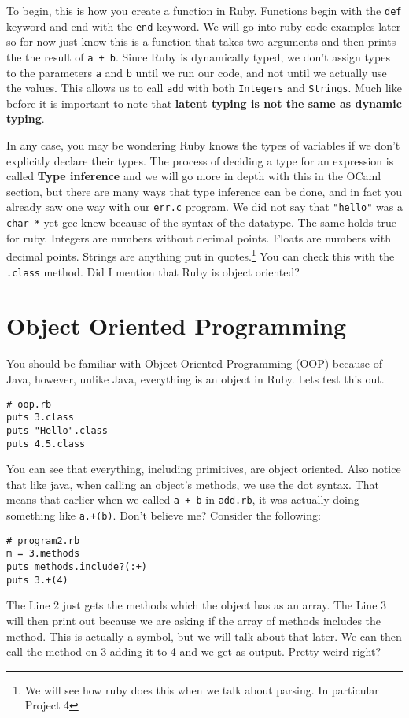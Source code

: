 \documentclass[main.tex]{subfiles}
\begin{document}
To begin, this is how you create a function in Ruby.
Functions begin with the \texttt{def} keyword and end with the \texttt{end} keyword. 
We will go into ruby code examples later so for now just know this is a function that takes two arguments and then prints the the result of \texttt{a + b}.
Since Ruby is dynamically typed, we don't assign types to the parameters \texttt{a} and \texttt{b} until we run our code, and not until we actually use the values.
This allows us to call \texttt{add} with both \texttt{Integers} and \texttt{Strings}. Much like before it is important to note that \textbf{latent typing is not the same as dynamic typing}.

In any case, you may be wondering Ruby knows the types of variables if we don't explicitly declare their types. 
The process of deciding a type for an expression is called \textbf{Type inference} and we will go more in depth with this in the OCaml section,
but there are many ways that type inference can be done, and in fact you already saw one way with our \texttt{err.c} program.
We did not say that \texttt{"hello"} was a \texttt{char *} yet gcc knew because of the syntax of the datatype. 
The same holds true for ruby. 
Integers are numbers without decimal points.
Floats are numbers with decimal points.
Strings are anything put in quotes.\footnote{We will see how ruby does this when we talk about parsing. In particular Project 4}
You can check this with the \texttt{.class} method. Did I mention that Ruby is object oriented?

\section{Object Oriented Programming}

You should be familiar with Object Oriented Programming (OOP) because of Java, however, unlike Java, everything is an object in Ruby. 
Lets test this out. 
\begin{lstlisting}[style=MyRubyStyle]
# oop.rb
puts 3.class
puts "Hello".class
puts 4.5.class
\end{lstlisting}
You can see that everything, including primitives, are object oriented. 
Also notice that like java, when calling an object's methods, we use the dot syntax.
That means that earlier when we called \texttt{a + b} in \texttt{add.rb}, it was actually doing something like \texttt{a.+(b)}. Don't believe me? 
Consider the following:
\begin{lstlisting}[style=MyRubyStyle]
# program2.rb
m = 3.methods
puts methods.include?(:+)
puts 3.+(4)
\end{lstlisting}
The Line 2 just gets the methods which the object  has as an array. The Line 3 will then print out  because we are asking if the array of methods includes the \cout{:+} method. This is actually a symbol, but we will talk about that later. 
We can then call the \cout{+} method on 3 adding it to 4 and we get  as output. Pretty weird right?\\
\end{document}
